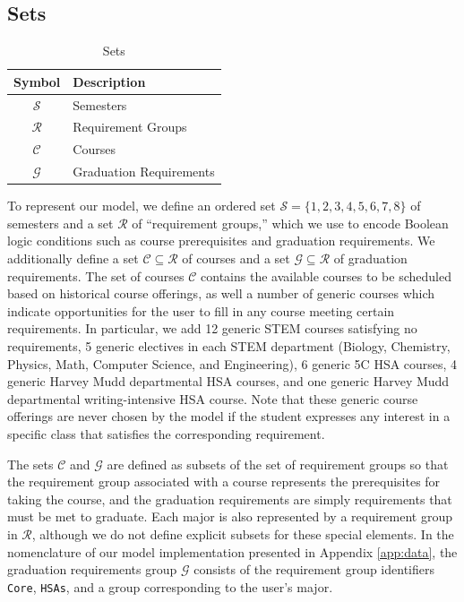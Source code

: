 \documentclass[12pt]{article}
\renewcommand{\S}{\mathcal{S}}
\renewcommand{\R}{\mathcal{R}}
\renewcommand{\C}{\mathcal{C}}
\newcommand{\G}{\mathcal{G}}
\begin{document}
\subsection{Sets}
\begin{table}[H]
    \centering
    \begin{tabular}{c|l}
        \hline 
        \textbf{Symbol} &  \textbf{Description} \\
        \hline 
        $\S$ & Semesters\\ 
        $\R$ & Requirement Groups \\ 
        $\C$ & Courses\\
        $\G$ & Graduation Requirements
    \end{tabular}
    \caption{Sets}
    \label{tab:sets}
\end{table}

To represent our model, we define an ordered set $\S=\{1,2,3,4,5,6,7,8\}$ of semesters and a set $\R$ of ``requirement groups,'' which we use to encode Boolean logic conditions such as course prerequisites and graduation requirements.
We additionally define a set $\C\subseteq\R$ of courses and a set $\G\subseteq\R$ of graduation requirements.
The set of courses $\C$ contains the available courses to be scheduled based on historical course offerings, as well a number of generic courses which indicate opportunities for the user to fill in any course meeting certain requirements.
In particular, we add 12 generic STEM courses satisfying no requirements, 5 generic electives in each STEM department (Biology, Chemistry, Physics, Math, Computer Science, and Engineering), 6 generic 5C HSA courses, 4 generic Harvey Mudd departmental HSA courses, and one generic Harvey Mudd departmental writing-intensive HSA course.
Note that these generic course offerings are never chosen by the model if the student expresses any interest in a specific class that satisfies the corresponding requirement.

The sets $\C$ and $\G$ are defined as subsets of the set of requirement groups so that the requirement group associated with a course represents the prerequisites for taking the course, and the graduation requirements are simply requirements that must be met to graduate.
Each major is also represented by a requirement group in $\R$, although we do not define explicit subsets for these special elements.
In the nomenclature of our model implementation presented in Appendix \ref{app:data}, the graduation requirements group $\G$ consists of the requirement group identifiers \verb|Core|, \verb|HSAs|, and a group corresponding to the user's major.
\end{document}
